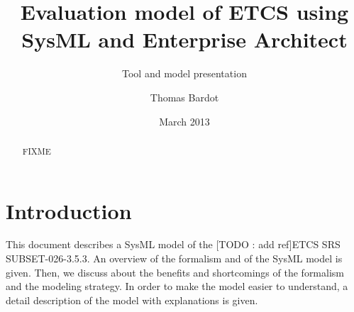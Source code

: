 \documentclass{template/openetcs_report}
\begin{document}
\frontmatter
{}




\title{Evaluation model of ETCS using SysML and Enterprise Architect}

\subtitle{Tool and model presentation}

\date{March 2013}

\author{Thomas Bardot}





\begin{abstract}
  FIXME
\end{abstract}

\maketitle
\tableofcontents
\listoffiguresandtables

\mainmatter


\chapter{Introduction}
This document describes a SysML model of the [TODO : add ref]ETCS SRS SUBSET-026-3.5.3. An overview of the formalism and of the SysML model is given. Then, we discuss about the benefits and shortcomings of the formalism and the modeling strategy. In order to make the model easier to understand, a detail description of the model with explanations is given.
\end{document}
